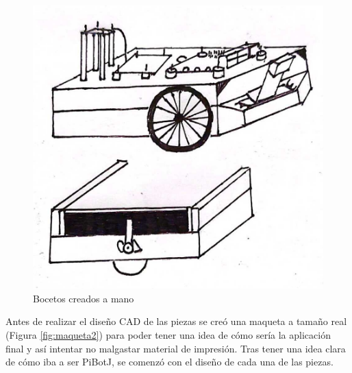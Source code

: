 \begin{figure}[ht!]
\begin{minipage}{0.5\linewidth}
		\centering
		\includegraphics[width=\linewidth]{figs/cap5/boceto_papel.jpeg}
	\end{minipage}
	\caption{Bocetos creados a mano}
	\label{fig:bocetos}
\end{figure}

Antes de realizar el diseño \acs{CAD} de las piezas se creó una maqueta a tamaño real (Figura \ref{fig:maqueta2}) para poder tener una idea de cómo sería la aplicación final y así intentar no malgastar material de impresión. Tras tener una idea clara de cómo iba a ser PiBotJ, se comenzó con el diseño de cada una de las piezas.  


